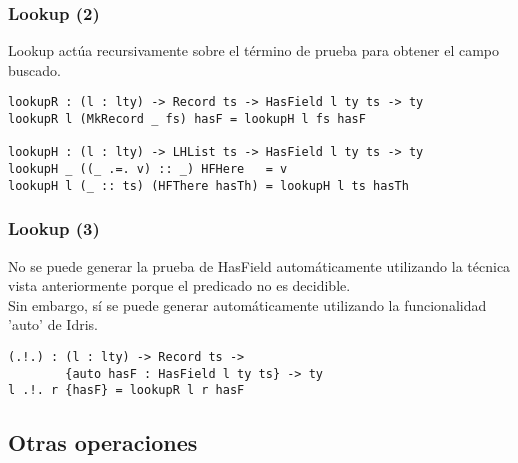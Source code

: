 \documentclass{beamer}
\begin{document}
\begin{frame}[fragile]
\frametitle{Lookup (2)}

Lookup actúa recursivamente sobre el término de prueba para obtener el campo buscado.

\begin{definition}
\begin{verbatim}
lookupR : (l : lty) -> Record ts -> HasField l ty ts -> ty
lookupR l (MkRecord _ fs) hasF = lookupH l fs hasF

lookupH : (l : lty) -> LHList ts -> HasField l ty ts -> ty
lookupH _ ((_ .=. v) :: _) HFHere   = v
lookupH l (_ :: ts) (HFThere hasTh) = lookupH l ts hasTh
\end{verbatim}
\end{definition}

\end{frame}

\begin{frame}[fragile]
\frametitle{Lookup (3)}

No se puede generar la prueba de HasField automáticamente utilizando la técnica vista anteriormente porque el predicado no es decidible. \\

Sin embargo, sí se puede generar automáticamente utilizando la funcionalidad 'auto' de Idris.

\pause

\begin{definition}
\begin{verbatim}
(.!.) : (l : lty) -> Record ts -> 
        {auto hasF : HasField l ty ts} -> ty
l .!. r {hasF} = lookupR l r hasF
\end{verbatim}
\end{definition}

\end{frame}

\subsection{Otras operaciones}
\end{document}
